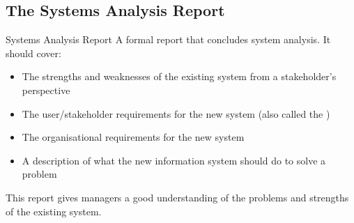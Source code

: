 \documentclass[\main/notes.tex]{subfiles}
\begin{document}
			\subsection{The Systems Analysis Report}
				\begin{definition}{Systems Analysis Report}
					A formal report that concludes system analysis. It should cover:
					\begin{itemize}[nosep]
						\item The strengths and weaknesses of the existing system from a stakeholder's perspective
						\item The user/stakeholder requirements for the new system (also called the )
						\item The organisational requirements for the new system
						\item A description of what the new information system should do to solve a problem
					\end{itemize}
					This report gives managers a good understanding of the problems and strengths of the existing system.
				\end{definition}

	\vbox{}
\end{document}
